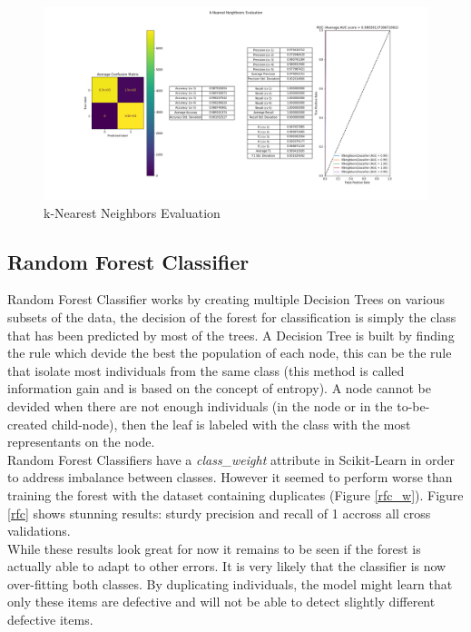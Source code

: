 \begin{figure}
    \center
    \includegraphics[scale=0.32]{img/knn_d.png}
    \caption{k-Nearest Neighbors Evaluation}
    \label{knn}
\end{figure}

\subsection{Random Forest Classifier}
Random Forest Classifier works by creating multiple Decision Trees on various subsets of the data, the decision of the forest for classification is simply the class that has been predicted by most of the trees\cite{rdf_wikipedia}. A Decision Tree is built by finding the rule which devide the best the population of each node, this can be the rule that isolate most individuals from the same class (this method is called information gain and is based on the concept of entropy)\cite{dtl_wikipedia}. A node cannot be devided when there are not enough individuals (in the node or in the to-be-created child-node), then the leaf is labeled with the class with the most representants on the node.\\

Random Forest Classifiers have a \textit{class\_weight} attribute in Scikit-Learn in order to address imbalance between classes\cite{rfc_scikit}. However it seemed to perform worse than training the forest with the dataset containing duplicates (Figure \ref{rfc_w}). Figure \ref{rfc} shows stunning results: sturdy precision and recall of 1 accross all cross validations.\\

While these results look great for now it remains to be seen if the forest is actually able to adapt to other errors. It is very likely that the classifier is now over-fitting both classes. By duplicating individuals, the model might learn that only these items are defective and will not be able to detect slightly different defective items.\\

